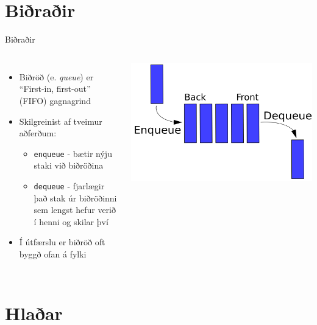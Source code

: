 \documentclass{beamer}
\begin{document}
\section{Biðraðir}

\begin{frame}{Biðraðir}
\begin{columns}[c]
\begin{itemize}
 \item Biðröð (e. \emph{queue}) er ``First-in, first-out'' (FIFO) gagnagrind
 \item Skilgreinist af tveimur aðferðum:
 \begin{itemize}
  \item \texttt{enqueue} - bætir nýju staki við biðröðina
  \item \texttt{dequeue} - fjarlægir það stak úr biðröðinni sem lengst hefur verið í henni og skilar því
 \end{itemize}
 \item Í útfærslu er biðröð oft byggð ofan á fylki
\end{itemize}
\includegraphics[width=\linewidth]{Pics/queue}
\end{columns}
\end{frame}

\section{Hlaðar}
\end{document}

